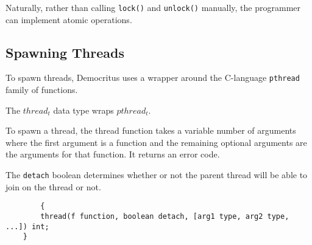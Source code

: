 		Naturally, rather than calling \texttt{lock()} and \texttt{unlock()} manually, the programmer can implement atomic operations.

	\subsection{Spawning Threads}
		To spawn threads, Democritus uses a wrapper around the C-language \texttt{pthread} family of functions.

		The \texttt{$thread_t$} data type wraps \texttt{$pthread_t$}.

		To spawn a thread, the thread function takes a variable number of arguments where the first argument is a function and the remaining optional arguments are the arguments for that function. It returns an error code.

		The \texttt{detach} boolean determines whether or not the parent thread will be able to join on the thread or not.
		\begin{lstlisting}
        {	
		thread(f function, boolean detach, [arg1 type, arg2 type, ...]) int;
	}
		\end{lstlisting}
